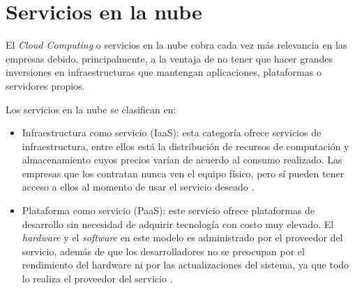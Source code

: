 \section{Servicios en la nube}

El \emph{Cloud Computing} o servicios en la nube cobra cada vez más relevancia en las empresas debido, principalmente, a la ventaja de no tener que hacer grandes inversiones en infraestructuras que mantengan aplicaciones, plataformas o servidores propios.

Los servicios en la nube se clasifican en:

\begin{itemize}
\item Infraestructura como servicio (IaaS): esta categoría ofrece servicios de infraestructura, entre ellos está la distribución de recursos de computación y almacenamiento cuyos precios varían de acuerdo al consumo realizado. Las empresas que los contratan nunca ven el equipo físico, pero sí pueden tener acceso a ellos al momento de usar el servicio deseado \citep{BOOK:2}.




\item Plataforma como servicio (PaaS): este servicio ofrece plataformas de desarrollo sin necesidad de adquirir tecnología con costo muy elevado. El \emph{hardware} y el \emph{software} en este modelo es administrado por el proveedor del servicio, además de que los desarrolladores no se preocupan por el rendimiento del hardware ni por las actualizaciones del sistema, ya que todo lo realiza el proveedor del servicio \citep{BOOK:2}.
 






\end{itemize}
